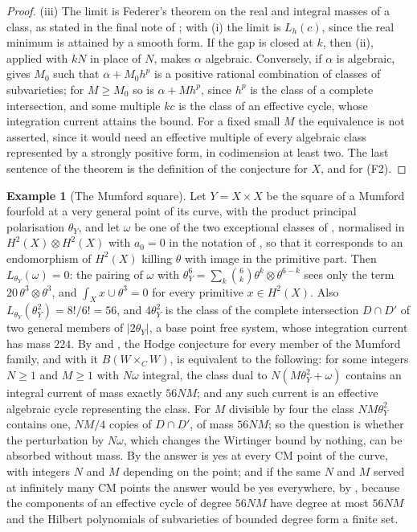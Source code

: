 \documentclass[11pt,reqno]{amsart}
\theoremstyle{plain}
\theoremstyle{definition}
\newtheorem{example}[theorem]{Example}
\theoremstyle{remark}
\begin{document}
\begin{proof}
(iii) The limit is Federer's theorem on the real and integral masses of a
class, as stated in the final note of \cite[Section~6]{HL09}; with (i) the
limit is $L_{h}(c)$, since the real minimum is attained by a smooth form. If
the gap is closed at $k$, then (ii), applied with $kN$ in place of $N$, makes
$\alpha$ algebraic. Conversely, if $\alpha$ is algebraic, 
gives $M_{0}$ such that $\alpha+M_{0}h^{p}$ is a positive rational
combination of classes of subvarieties; for $M\ge M_{0}$ so is
$\alpha+Mh^{p}$, since $h^{p}$ is the class of a complete intersection, and
some multiple $kc$ is the class of an effective cycle, whose integration
current attains the bound. For a fixed small $M$ the equivalence is not asserted, since it would
need an effective multiple of every algebraic class represented by a
strongly positive form, in codimension at least two. The last sentence of the
theorem is the definition of the conjecture for $X$, and 
for \textup{(F2)}.
\end{proof}

\begin{example}[The Mumford square]\label{ex:mumfordmass}
Let $Y=X\times X$ be the square of a Mumford fourfold at a very general point
of its curve, with the product principal polarisation $\theta_{Y}$, and let
$\omega$ be one of the two exceptional classes of ,
normalised in $H^{2}(X)\otimes H^{2}(X)$ with $a_{0}=0$ in the notation of
, so that it corresponds to an endomorphism of $H^{2}(X)$
killing $\theta$ with image in the primitive part. Then
$L_{\theta_{Y}}(\omega)=0$: the pairing of $\omega$ with
$\theta_{Y}^{6}=\sum_{k}\binom6k\theta^{k}\otimes\theta^{6-k}$ sees only the
term $20\,\theta^{3}\otimes\theta^{3}$, and $\int_{X}x\cup\theta^{3}=0$ for
every primitive $x\in H^{2}(X)$. Also $L_{\theta_{Y}}(\theta_{Y}^{2})=8!/6!=56$,
and $4\theta_{Y}^{2}$ is the class of the complete intersection $D\cap D'$ of two
general members of $|2\theta_{Y}|$, a base point free system, whose integration
current has mass $224$. By  and , the
Hodge conjecture for every member of the Mumford family, and with it
$B(W\times_{C}W)$, is equivalent to the following: for some integers
$N\ge1$ and $M\ge1$ with $N\omega$ integral, the class dual to
$N(M\theta_{Y}^{2}+\omega)$ contains an integral current of mass exactly
$56NM$; and any such current is an effective algebraic cycle representing the
class. For $M$ divisible by four the class $NM\theta_{Y}^{2}$ contains one,
$NM/4$ copies of $D\cap D'$, of mass $56NM$; so the question is whether the
perturbation by $N\omega$, which changes the Wirtinger bound by nothing, can
be absorbed without mass. By  the answer is yes at
every CM point of the curve, with integers $N$ and $M$ depending on the
point; and if the same $N$ and $M$ served at infinitely many CM points the
answer would be yes everywhere, by , because the
components of an effective cycle of degree $56NM$ have degree at most $56NM$
and the Hilbert polynomials of subvarieties of bounded degree form a finite
set.
\end{example}
\end{document}

